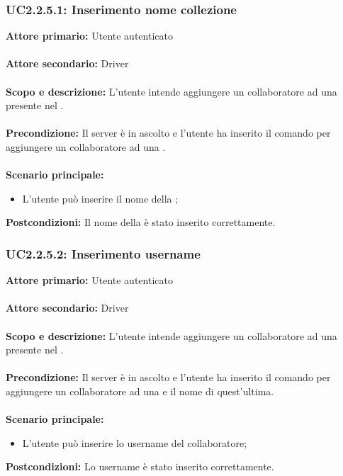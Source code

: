 \documentclass{scalatekids-article}
\begin{document}
\subsubsection{UC2.2.5.1: Inserimento nome collezione}

\textbf{Attore primario:} Utente autenticato\\ \\
\textbf{Attore secondario:} Driver\\ \\
\textbf{Scopo e descrizione:} L’utente intende aggiungere un collaboratore ad una  presente nel .\\ \\
\textbf{Precondizione:} Il server è in ascolto e l’utente ha inserito il comando per aggiungere un collaboratore ad una .\\ \\
\textbf{Scenario principale:}
\begin{itemize}
\item L'utente può inserire il nome della ;
\end{itemize}
\textbf{Postcondizioni:} Il nome della  è stato inserito correttamente.

\subsubsection{UC2.2.5.2: Inserimento username}

\textbf{Attore primario:} Utente autenticato\\ \\
\textbf{Attore secondario:} Driver\\ \\
\textbf{Scopo e descrizione:} L’utente intende aggiungere un collaboratore ad una  presente nel .\\ \\
\textbf{Precondizione:} Il server è in ascolto e l’utente ha inserito il comando per aggiungere un collaboratore ad una  e il nome di quest'ultima.\\ \\
\textbf{Scenario principale:}
\begin{itemize}
\item L'utente può inserire lo username del collaboratore;
\end{itemize}
\textbf{Postcondizioni:} Lo username è stato inserito correttamente.
\end{document}
